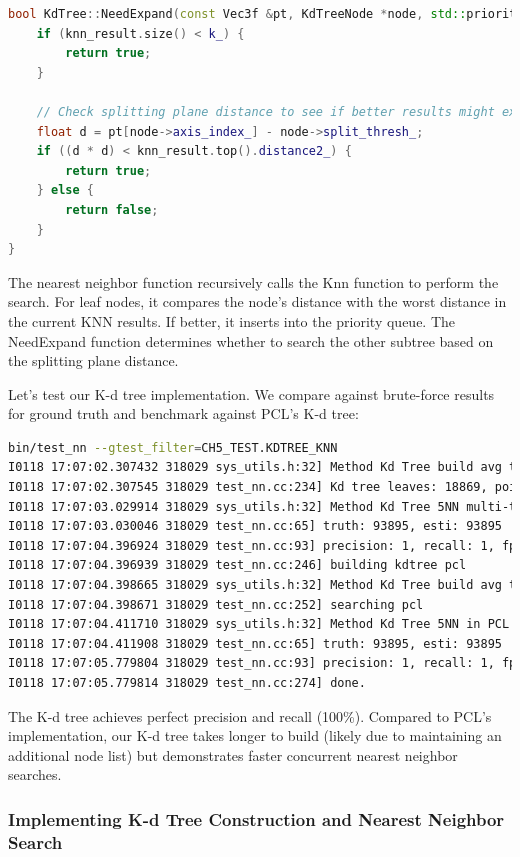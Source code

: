 \begin{lstlisting}[language=c++,caption=src/ch5/kdtree.cc]
bool KdTree::NeedExpand(const Vec3f &pt, KdTreeNode *node, std::priority_queue<NodeAndDistance> &knn_result) const {
	if (knn_result.size() < k_) {
		return true;
	}
	
	// Check splitting plane distance to see if better results might exist
	float d = pt[node->axis_index_] - node->split_thresh_;
	if ((d * d) < knn_result.top().distance2_) {
		return true;
	} else {
		return false;
	}
}
\end{lstlisting}

The nearest neighbor function recursively calls the Knn function to perform the search. For leaf nodes, it compares the node's distance with the worst distance in the current KNN results. If better, it inserts into the priority queue. The NeedExpand function determines whether to search the other subtree based on the splitting plane distance.

Let's test our K-d tree implementation. We compare against brute-force results for ground truth and benchmark against PCL's K-d tree:

\begin{lstlisting}[language=sh, caption=Terminal input:]
bin/test_nn --gtest_filter=CH5_TEST.KDTREE_KNN 
I0118 17:07:02.307432 318029 sys_utils.h:32] Method Kd Tree build avg time/calls: 4.34059/1 ms.
I0118 17:07:02.307545 318029 test_nn.cc:234] Kd tree leaves: 18869, points: 18869
I0118 17:07:03.029914 318029 sys_utils.h:32] Method Kd Tree 5NN multi-thread avg time/calls: 3.01146/1 ms.
I0118 17:07:03.030046 318029 test_nn.cc:65] truth: 93895, esti: 93895
I0118 17:07:04.396924 318029 test_nn.cc:93] precision: 1, recall: 1, fp: 0, fn: 0
I0118 17:07:04.396939 318029 test_nn.cc:246] building kdtree pcl
I0118 17:07:04.398665 318029 sys_utils.h:32] Method Kd Tree build avg time/calls: 1.68209/1 ms.
I0118 17:07:04.398671 318029 test_nn.cc:252] searching pcl
I0118 17:07:04.411710 318029 sys_utils.h:32] Method Kd Tree 5NN in PCL avg time/calls: 12.9858/1 ms.
I0118 17:07:04.411908 318029 test_nn.cc:65] truth: 93895, esti: 93895
I0118 17:07:05.779804 318029 test_nn.cc:93] precision: 1, recall: 1, fp: 0, fn: 0
I0118 17:07:05.779814 318029 test_nn.cc:274] done.
\end{lstlisting}

The K-d tree achieves perfect precision and recall (100\%). Compared to PCL's implementation, our K-d tree takes longer to build (likely due to maintaining an additional node list) but demonstrates faster concurrent nearest neighbor searches.

\subsubsection{Implementing K-d Tree Construction and Nearest Neighbor Search}  

